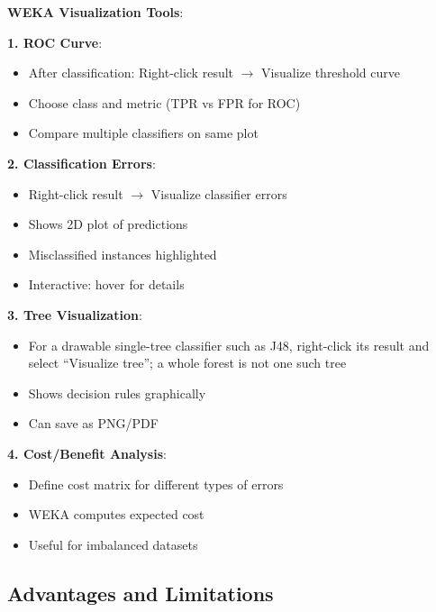 \documentclass[11pt,twoside]{article}
\numberwithin{equation}{section}
\theoremstyle{plain}
\theoremstyle{definition}
\theoremstyle{remark}
\newenvironment{keyidea}{
  \begin{tcolorbox}[colback=yellow!5!white,
                    colframe=yellow!50!black,
                    title=Key Idea,
                    breakable,
                    enhanced,
                    sharp corners,
                    boxrule=0.8pt,
                    left=6pt, right=6pt, top=6pt, bottom=6pt]
}{
  \end{tcolorbox}
}
\begin{document}
\begin{keyidea}
\textbf{WEKA Visualization Tools}:

\textbf{1. ROC Curve}:
\begin{itemize}
\item After classification: Right-click result $\to$ Visualize threshold curve
\item Choose class and metric (TPR vs FPR for ROC)
\item Compare multiple classifiers on same plot
\end{itemize}

\textbf{2. Classification Errors}:
\begin{itemize}
\item Right-click result $\to$ Visualize classifier errors
\item Shows 2D plot of predictions
\item Misclassified instances highlighted
\item Interactive: hover for details
\end{itemize}

\textbf{3. Tree Visualization}:
\begin{itemize}
\item For a drawable single-tree classifier such as J48, right-click its result and select ``Visualize tree''; a whole forest is not one such tree
\item Shows decision rules graphically
\item Can save as PNG/PDF
\end{itemize}

\textbf{4. Cost/Benefit Analysis}:
\begin{itemize}
\item Define cost matrix for different types of errors
\item WEKA computes expected cost
\item Useful for imbalanced datasets
\end{itemize}
\end{keyidea}

\subsection{Advantages and Limitations}
\end{document}
